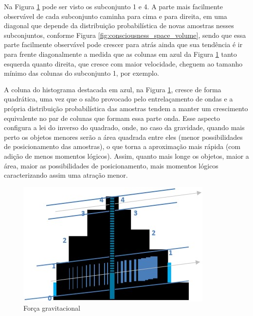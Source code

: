Na Figura \ref{fig:consciousness_gravitational_force} pode ser visto os subconjunto 1 e 4. A parte mais facilmente observável de cada subconjunto caminha para cima e para direita, em uma diagonal que depende da distribuição probabilística de novas amostras nesses subconjuntos, conforme Figura \ref{fig:consciousness_space_volume}, sendo que essa parte facilmente observável pode crescer para atrás ainda que sua tendência é ir para frente diagonalmente a medida que as colunas em azul da Figura \ref{fig:consciousness_gravitational_force} tanto esquerda quanto direita, que cresce com maior velocidade, cheguem ao tamanho mínimo das colunas do subconjunto 1, por exemplo.

A coluna do histograma destacada em azul, na Figura \ref{fig:consciousness_gravitational_force}, cresce de forma quadrática, uma vez que o salto provocado pelo entrelaçamento de ondas e a própria distribuição probabilística das amostras tendem a manter um crescimento equivalente no par de colunas que formam essa parte onda. Esse aspecto configura a lei do inverso do quadrado, onde, no caso da gravidade, quando mais perto os objetos menores serão a área quadrada entre eles (menor possibilidades de posicionamento das amostras), o que torna a aproximação mais rápida (com adição de menos momentos lógicos). Assim, quanto mais longe os objetos, maior a área, maior as possibilidades de posicionamento, mais momentos lógicos caracterizando assim uma atração menor.
	\begin{figure}[H]
	\caption{Força gravitacional}
	\label{fig:consciousness_gravitational_force}
	\centering
	\includegraphics[scale=.9]{sections/images/consciousness_gravitational_force.jpg}
	\end{figure}

